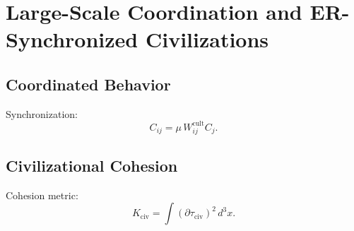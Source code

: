 \chapter{Large-Scale Coordination and ER-Synchronized Civilizations}

\section{Coordinated Behavior}
Synchronization:
\[
C_{ij} = \mu\,W^{\mathrm{cult}}_{ij}C_j.
\]

\section{Civilizational Cohesion}
Cohesion metric:
\[
K_{\mathrm{civ}} = \int (\partial\tau_{\mathrm{civ}})^2\, d^3x.
\]

